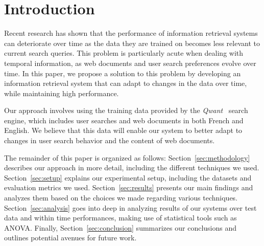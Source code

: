 \enlargethispage{2\baselineskip}
\section{Introduction}
\label{sec:introduction}

Recent research has shown that the performance of information retrieval systems can deteriorate over time as the data they are trained on becomes less relevant to current search queries. 
This problem is particularly acute when dealing with temporal information, as web documents and user search preferences evolve over time. 
In this paper, we propose a solution to this problem by developing an information retrieval system that can adapt to changes in the data over time, while maintaining high performance.

Our approach involves using the training data provided by the \textit{Qwant}~\cite{qwant} search engine, which includes user searches and web documents in both French and English.
We believe that this data will enable our system to better adapt to changes in user search behavior and the content of web documents.

The remainder of this paper is organized as follows: 
Section~\ref{sec:methodology} describes our approach in more detail, including the different techniques we used. 
Section~\ref{sec:setup} explains our experimental setup, including the datasets and evaluation metrics we used. 
Section~\ref{sec:results} presents our main findings and analyzes them based on the choices we made regarding various techniques. 
Section~\ref{sec:analysis} goes into deep in analyzing results of our systems over test data and within time performances, making use of statistical tools such as ANOVA.
Finally, Section~\ref{sec:conclusion} summarizes our conclusions and outlines potential avenues for future work.